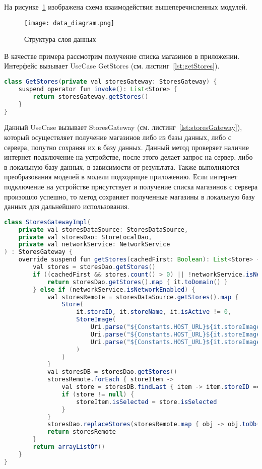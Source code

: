 На рисунке~\ref{fig:arch:data_diagram} изображена схема взаимодействия вышеперечисленных модулей.
 
\begin{figure}[H]
 \centering
   \texttt{[image: data\_diagram.png]} 
   \caption{Структура слоя данных}
   \label{fig:arch:data_diagram}
\end{figure}
 
В качестве примера рассмотрим получение списка магазинов в приложении. Интерфейс вызывает UseCase GetStores (см. листинг~\ref{lst:getStores}).

\begin{lstlisting}[language=Java,label={lst:getStores},caption={UseCase GetStores}]
class GetStores(private val storesGateway: StoresGateway) {
    suspend operator fun invoke(): List<Store> {
        return storesGateway.getStores()
    }
}
\end{lstlisting}

Данный UseCase вызывает StoresGateway (см. листинг~\ref{lst:storesGateway}), который осуществляет получение магазинов либо из базы данных, либо с сервера, попутно сохраняя их в базу данных. Данный метод проверяет наличие интернет подключение на устройстве, после этого делает запрос на сервер, либо в локальную базу данных, в зависимости от результата. Также выполняются преобразования моделей в модели подходящие приложению. Если интернет подключение на устройстве присутствует и получение списка магазинов с сервера произошло успешно, то метод сохраняет полученные магазины в локальную базу данных для дальнейшего использования.
\begin{lstlisting}[language=Java,label={lst:storesGateway},caption={StoresGateway}]
class StoresGatewayImpl(
    private val storesDataSource: StoresDataSource,
    private val storesDao: StoreLocalDao,
    private val networkService: NetworkService
) : StoresGateway {
    override suspend fun getStores(cachedFirst: Boolean): List<Store> {
        val stores = storesDao.getStores()
        if ((cachedFirst && stores.count() > 0) || !networkService.isNetworkEnabled) {
            return storesDao.getStores().map { it.toDomain() }
        } else if (networkService.isNetworkEnabled) {
            val storesRemote = storesDataSource.getStores().map {
                Store(
                    it.storeID, it.storeName, it.isActive != 0,
                    StoreImage(
                        Uri.parse("${Constants.HOST_URL}${it.storeImage.bannerPath}"),
                        Uri.parse("${Constants.HOST_URL}${it.storeImage.logoPath}"),
                        Uri.parse("${Constants.HOST_URL}${it.storeImage.iconPath}")
                    )
                )
            }
            val storesDB = storesDao.getStores()
            storesRemote.forEach { storeItem ->
                val store = storesDB.findLast { item -> item.storeID == storeItem.id }
                if (store != null) {
                    storeItem.isSelected = store.isSelected
                }
            }
            storesDao.replaceStores(storesRemote.map { obj -> obj.toDb() })
            return storesRemote
        }
        return arrayListOf()
    }
}

\end{lstlisting}


